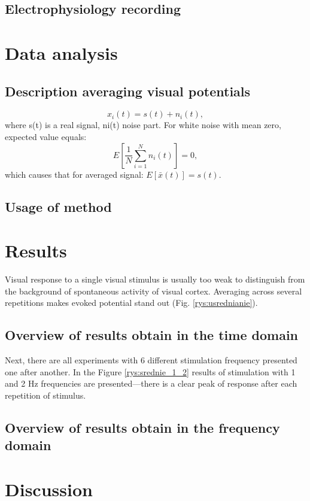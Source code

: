\documentclass{pracalicmgr}
\begin{document}
 	\section{Electrophysiology recording}

    \chapter{Data analysis}
    \section{Description averaging visual potentials}
 
    \begin{equation}
    x_i(t) = s(t) + n_i(t),
    \end{equation}
    where s(t) is a real signal, ni(t) noise part. For white noise with mean zero, expected value equals:
    \begin{equation}
    E\left[ \frac{1}{N}\sum_{i=1}^{N} n_i(t)\right] = 0, 
    \end{equation}
    which causes that for averaged signal: $E\left[ \bar{x}(t) \right] = s(t).$
    
    \section{Usage of method}

     
    \begin{figure}[H]

    	\label{rys:wybieranie_kanalow}
    \end{figure} 
     
    \chapter{Results}
    Visual response to a single visual stimulus is usually too weak to distinguish from the background of spontaneous activity of visual cortex. Averaging across several repetitions makes evoked potential stand out (Fig. \ref{rys:usrednianie}).
    

    
    \section{Overview of results obtain in the time domain}
    Next, there are all experiments with 6 different stimulation frequency presented one after another. In the Figure \ref{rys:srednie_1_2} results of stimulation with 1 and 2 Hz frequencies are presented---there is a clear peak of response after each repetition of stimulus.
    

    
  
	
    \section{Overview of results obtain in the frequency domain}
    


    \chapter{Discussion}
    
    

\end{document}
